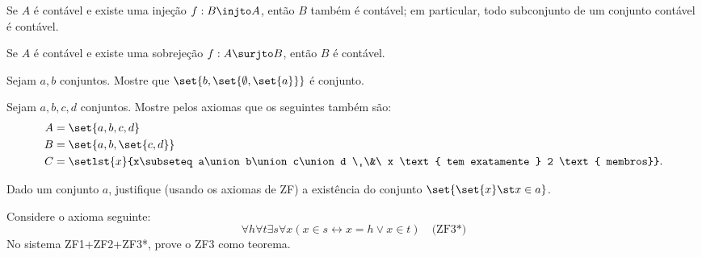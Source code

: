 \begin{exercise}
    Se $A$ é contável e existe uma injeção $f : B \injto A$, então $B$ também é contável; em particular, todo subconjunto de um conjunto contável é contável.
\end{exercise}

\begin{exercise}
    Se $A$ é contável e existe uma sobrejeção $f : A \surjto B$, então $B$ é contável.
\end{exercise}

\begin{exercise}
    Sejam $a,b$ conjuntos. Mostre que $\set{b,\set{\emptyset,\set{a}}}$ é conjunto.
\end{exercise}

\begin{exercise}
    Sejam $a,b,c,d$ conjuntos. Mostre pelos axiomas que os seguintes também são:
    $$
    \begin{aligned}
        A &= \set {a, b, c, d}\\
        B &= \set {a, b, \set {c, d}}\\
        C &= \setlst {x} {x\subseteq a\union b\union c\union d \ \&\ x \text{ tem exatamente } 2 \text { membros}}.
    \end{aligned}
    $$
\end{exercise}

\begin{exercise}
    Dado um conjunto $a$, justifique (usando os axiomas de ZF) a existência do conjunto $\set{\set{x} \st x \in a}$.
\end{exercise}

\begin{exercise}
    Considere o axioma seguinte:
$$
    \forall h \forall t \exists s \forall x (x \in s \leftrightarrow x = h \vee x \in t) \quad \text{(ZF3*)}
$$
    No sistema ZF1+ZF2+ZF3*, prove o ZF3 como teorema.
\end{exercise}
